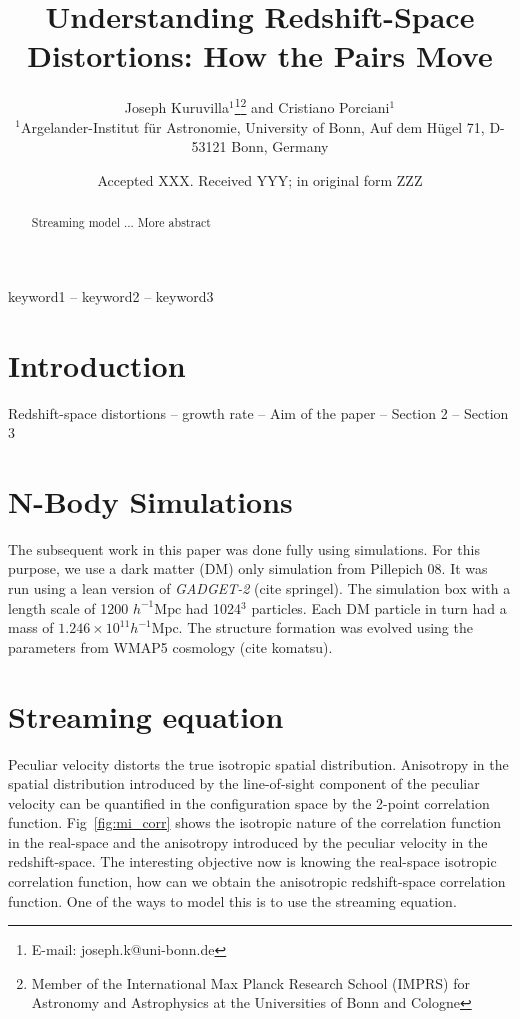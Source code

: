 \documentclass[a4paper,fleqn,usenatbib]{mnras}
\title[RSD: Streaming model]{Understanding Redshift-Space Distortions: How the Pairs Move}
\author[J. Kuruvilla and C. Porciani]{
	Joseph Kuruvilla$^{1}$\thanks{E-mail: joseph.k@uni-bonn.de}\thanks{Member of the International Max Planck Research School (IMPRS) for Astronomy and Astrophysics at the Universities of Bonn and Cologne} and
	Cristiano Porciani$^{1}$
	\\
	$^{1}$Argelander-Institut f\"ur Astronomie, University of Bonn, Auf dem H\"ugel 71, D-53121 Bonn, Germany
}
\date{Accepted XXX. Received YYY; in original form ZZZ}
\begin{document}
	\label{firstpage}
	\pagerange{\pageref{firstpage}--\pageref{lastpage}}
	\maketitle
	
	\begin{abstract}
		Streaming model ... More abstract
	\end{abstract}
	
	\begin{keywords}
		keyword1 -- keyword2 -- keyword3
	\end{keywords}
	
	
	
	\section{Introduction}
	\label{sec:intro}
	
	Redshift-space distortions -- growth rate -- Aim of the paper -- Section 2 -- Section 3 
	
	
	\section{N-Body Simulations}
	
	The subsequent work in this paper was done fully using simulations. For this purpose, we use a dark matter (DM) only simulation from Pillepich 08. It was run using a lean version of \emph{GADGET-2} (cite springel). The simulation box with a length scale of 1200 $h^{-1} \mathrm{Mpc}$ had 1024$^3$ particles. Each DM particle in turn had a mass of $1.246 \times 10^{11} h^{-1} \mathrm{Mpc}$. The structure formation was evolved using the parameters from WMAP5 cosmology (cite komatsu). 
	\section{Streaming equation}
	
	Peculiar velocity distorts the true isotropic spatial distribution. Anisotropy in the spatial distribution introduced by the line-of-sight component of the peculiar velocity can be quantified in the configuration space by the 2-point correlation function. Fig~\ref{fig:mi_corr} shows the isotropic nature of the correlation function in the real-space and the anisotropy introduced by the peculiar velocity in the redshift-space. The interesting objective now is knowing the real-space isotropic correlation function, how can we obtain the anisotropic redshift-space correlation function. One of the ways to model this is to use the streaming equation.
	
\end{document}
